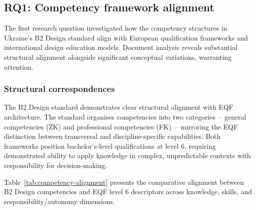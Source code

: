 \documentclass[ed]{acnsart}
\begin{document}
	\subsection{RQ1: Competency framework alignment}
	
	The first research question investigated how the competency structures in Ukraine's B2 Design standard align with European qualification frameworks and international design education models. Document analysis reveals substantial structural alignment alongside significant conceptual variations, warranting attention.
	
	\subsubsection{Structural correspondences}
	
	The B2 Design standard demonstrates clear structural alignment with EQF architecture. The standard organises competencies into two categories~-- general competencies (ZK) and professional competencies (FK)~-- mirroring the EQF distinction between transversal and discipline-specific capabilities. Both frameworks position bachelor's-level qualifications at level 6, requiring demonstrated ability to apply knowledge in complex, unpredictable contexts with responsibility for decision-making.
	
	Table~\ref{tab:competency-alignment} presents the comparative alignment between B2 Design competencies and EQF level 6 descriptors across knowledge, skills, and responsibility/autonomy dimensions.
	
\end{document}
